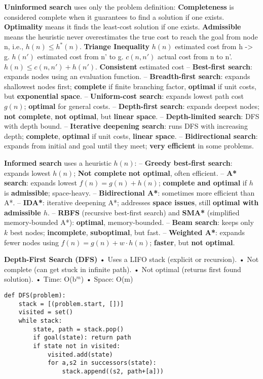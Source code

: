 ﻿\documentclass[10pt]{article}
\begin{document}
\begin{multicols*}{2}
\textbf{Uninformed search} uses only the problem definition:
\textbf{Completeness} is considered complete when it guarantees to find a solution if one exists. 
\textbf{Optimality} means it finds the least-cost solution if one exists. 
\textbf{Admissible} means the heuristic never overestimates the true cost to reach the goal from node n, i.e., $h(n) \leq h^*(n)$.
\textbf{Triange Inequality} $h(n)$ estimated cost from h -> g. $h(n')$ estimated cost from n' to g. $c(n, n')$ actual cost from n to n'. $h(n) \leq c(n, n') + h(n')$.
\textbf{Consistent} estimated cost 
– \textbf{Best-first search}: expands nodes using an evaluation function.  
– \textbf{Breadth-first search}: expands shallowest nodes first; \textbf{complete} if finite branching factor, \textbf{optimal} if unit costs, but \textbf{exponential space}.  
– \textbf{Uniform-cost search}: expands lowest path cost $g(n)$; \textbf{optimal} for general costs.  
– \textbf{Depth-first search}: expands deepest nodes; \textbf{not complete}, \textbf{not optimal}, but \textbf{linear space}.  
– \textbf{Depth-limited search}: DFS with depth bound.  
– \textbf{Iterative deepening search}: runs DFS with increasing depth; \textbf{complete}, \textbf{optimal} if unit costs, \textbf{linear space}.  
– \textbf{Bidirectional search}: expands from initial and goal until they meet; \textbf{very efficient} in some problems.  

\textbf{Informed search} uses a heuristic $h(n)$:  
– \textbf{Greedy best-first search}: expands lowest $h(n)$;\textbf{ Not complete} \textbf{not optimal}, often efficient.  
– \textbf{A* search}: expands lowest $f(n)=g(n)+h(n)$; \textbf{complete and optimal} if $h$ is \textbf{admissible}; space-heavy.  
– \textbf{Bidirectional A*}: sometimes more efficient than A*.  
– \textbf{IDA*}: iterative deepening A*; addresses \textbf{space issues}, still \textbf{optimal with admissible $h$}.  
– \textbf{RBFS} (recursive best-first search) and \textbf{SMA*} (simplified memory-bounded A*): \textbf{optimal}, memory-bounded.  
– \textbf{Beam search}: keeps only $k$ best nodes; \textbf{incomplete}, \textbf{suboptimal}, but fast.  
– \textbf{Weighted A*}: expands fewer nodes using $f(n)=g(n)+w \cdot h(n)$; \textbf{faster}, but \textbf{not optimal}.  


\textbf{Depth-First Search (DFS)}  
• Uses a LIFO stack (explicit or recursion).  
• Not complete (can get stuck in infinite path).  
• Not optimal (returns first found solution).  
• Time: O(b$^m$) \quad • Space: O(m)  
\begin{minipage}{\linewidth}
\begin{lstlisting}
def DFS(problem):
    stack = [(problem.start, [])]
    visited = set()
    while stack:
        state, path = stack.pop()
        if goal(state): return path
        if state not in visited:
            visited.add(state)
            for a,s2 in successors(state):
                stack.append((s2, path+[a]))
\end{lstlisting}
\end{minipage}


\end{multicols*}
\end{document}
